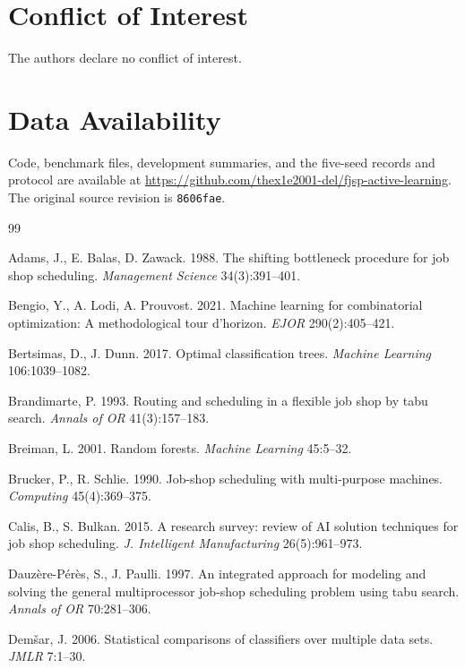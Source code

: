 \documentclass[conference]{IEEEtran}
\begin{document}
\section*{Conflict of Interest}
The authors declare no conflict of interest.

\section*{Data Availability}
Code, benchmark files, development summaries, and the five-seed records and protocol are available at \url{https://github.com/thex1e2001-del/fjsp-active-learning}. The original source revision is \texttt{8606fae}.

\begin{thebibliography}{99}

 Adams, J., E. Balas, D. Zawack. 1988. The shifting bottleneck procedure for job shop scheduling. \textit{Management Science} 34(3):391--401.

 Bengio, Y., A. Lodi, A. Prouvost. 2021. Machine learning for combinatorial optimization: A methodological tour d'horizon. \textit{EJOR} 290(2):405--421.

 Bertsimas, D., J. Dunn. 2017. Optimal classification trees. \textit{Machine Learning} 106:1039--1082.

 Brandimarte, P. 1993. Routing and scheduling in a flexible job shop by tabu search. \textit{Annals of OR} 41(3):157--183.

 Breiman, L. 2001. Random forests. \textit{Machine Learning} 45:5--32.

 Brucker, P., R. Schlie. 1990. Job-shop scheduling with multi-purpose machines. \textit{Computing} 45(4):369--375.

 Calis, B., S. Bulkan. 2015. A research survey: review of AI solution techniques for job shop scheduling. \textit{J. Intelligent Manufacturing} 26(5):961--973.

 Dauz\`ere-P\'er\`es, S., J. Paulli. 1997. An integrated approach for modeling and solving the general multiprocessor job-shop scheduling problem using tabu search. \textit{Annals of OR} 70:281--306.

 Dem\v{s}ar, J. 2006. Statistical comparisons of classifiers over multiple data sets. \textit{JMLR} 7:1--30.


\end{thebibliography}
\end{document}

